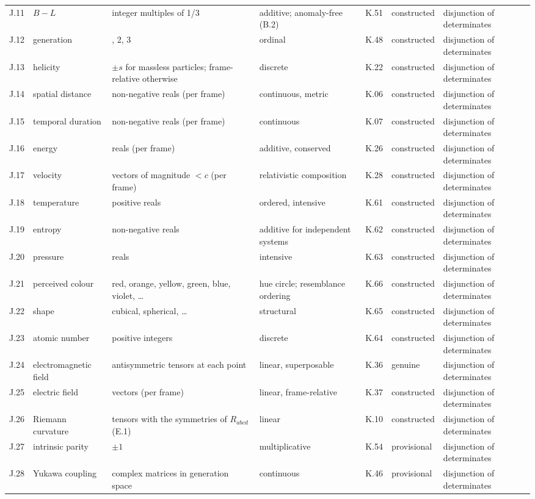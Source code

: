 {\begin{longtable}{@{}l>{\raggedright\arraybackslash}p{2.3cm}>{\raggedright\arraybackslash}p{4.5cm}>{\raggedright\arraybackslash}p{2.9cm}l>{\raggedright\arraybackslash}p{1.6cm}>{\raggedright\arraybackslash}p{1.7cm}@{}}
J.11 & $B-L$ & integer multiples of 1/3 & additive; anomaly-free (B.2) & K.51 & constructed & disjunction of determinates \\
J.12 & generation & 1, 2, 3 & ordinal & K.48 & constructed & disjunction of determinates \\
J.13 & helicity & $\pm s$ for massless particles; frame-relative otherwise & discrete & K.22 & constructed & disjunction of determinates \\
J.14 & spatial distance & non-negative reals (per frame) & continuous, metric & K.06 & constructed & disjunction of determinates \\
J.15 & temporal duration & non-negative reals (per frame) & continuous & K.07 & constructed & disjunction of determinates \\
J.16 & energy & reals (per frame) & additive, conserved & K.26 & constructed & disjunction of determinates \\
J.17 & velocity & vectors of magnitude $<c$ (per frame) & relativistic composition & K.28 & constructed & disjunction of determinates \\
J.18 & temperature & positive reals & ordered, intensive & K.61 & constructed & disjunction of determinates \\
J.19 & entropy & non-negative reals & additive for independent systems & K.62 & constructed & disjunction of determinates \\
J.20 & pressure & reals & intensive & K.63 & constructed & disjunction of determinates \\
J.21 & perceived colour & red, orange, yellow, green, blue, violet, \dots & hue circle; resemblance ordering & K.66 & constructed & disjunction of determinates \\
J.22 & shape & cubical, spherical, \dots & structural & K.65 & constructed & disjunction of determinates \\
J.23 & atomic number & positive integers & discrete & K.64 & constructed & disjunction of determinates \\
J.24 & electromagnetic field & antisymmetric tensors at each point & linear, superposable & K.36 & genuine & disjunction of determinates \\
J.25 & electric field & vectors (per frame) & linear, frame-relative & K.37 & constructed & disjunction of determinates \\
J.26 & Riemann curvature & tensors with the symmetries of $R_{abcd}$ (E.1) & linear & K.10 & constructed & disjunction of determinates \\
J.27 & intrinsic parity & $\pm 1$ & multiplicative & K.54 & provisional & disjunction of determinates \\
J.28 & Yukawa coupling & complex matrices in generation space & continuous & K.46 & provisional & disjunction of determinates \\
\end{longtable}}
